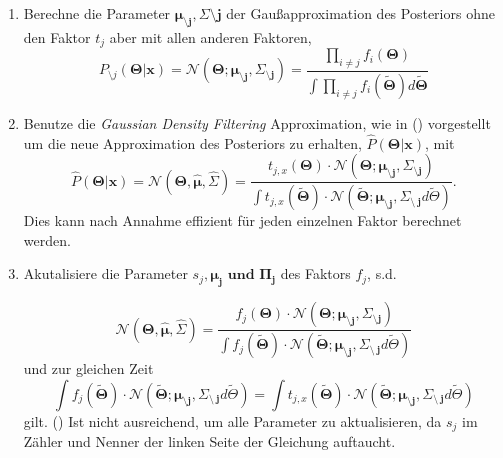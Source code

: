 \documentclass[12pt,a4paper]{scrartcl}
\numberwithin{equation}{section}
\begin{document}
\begin{enumerate}
 \item Berechne die Parameter $ \mathbf{\mu_{\setminus j}}, \mathbf{\varSigma{\setminus j}} $ der Gaußapproximation des Posteriors ohne
  den Faktor $t_j$ aber mit allen anderen Faktoren, 
  \begin{equation}
   P_{\setminus j}(\mathbf{\Theta|x}) = \mathcal{N}(\mathbf{\Theta; \mu_{ \setminus j} , \varSigma_{\setminus j}}) = \frac{\prod_{i \neq j}{f_i(\mathbf{\Theta})}}{ \int \prod_{i \neq j}{f_i(\mathbf{\tilde \Theta})} d \mathbf{\tilde \Theta} }
  \end{equation}

  \item Benutze die \textit{Gaussian Density Filtering} Approximation, wie in () vorgestellt um die neue 
  Approximation des Posteriors zu erhalten, $\hat P(\mathbf{\Theta|x})$, mit
  \begin{equation}
   \hat P(\mathbf{\Theta|x}) = \mathcal{N}(\mathbf{\Theta, \hat \mu, \hat \varSigma}) = \frac{ t_{j,x}(\mathbf{\Theta}) \cdot \mathcal{N}(\mathbf{\Theta; \mu_{\setminus j}, \varSigma_{\setminus j}})}{\int t_{j,x}(\mathbf{ \tilde \Theta}) \cdot \mathcal{N}(\mathbf{\tilde \Theta; \mu_{ \setminus j}, \varSigma_{\setminus\ j}} d \tilde \Theta ) }.
  \end{equation}
  Dies kann nach Annahme effizient für jeden einzelnen Faktor berechnet werden. 
  \item Akutalisiere die Parameter $s_j, \mathbf{\mu_j \text{ und } \Pi_j}$ des Faktors $f_j$, s.d.
  
  \begin{equation}
   \mathcal{N}(\mathbf{\Theta, \hat \mu, \hat \varSigma}) = \frac{ f_j(\mathbf{\Theta}) \cdot \mathcal{N}(\mathbf{\Theta; \mu_{\setminus j}, \varSigma_{\setminus j}})}{\int f_j(\mathbf{ \tilde \Theta}) \cdot \mathcal{N}(\mathbf{\tilde \Theta; \mu_{ \setminus j}, \varSigma_{\setminus\ j}} d \tilde \Theta ) }
  \end{equation}
   und zur gleichen Zeit
   \begin{equation}
    \int f_j(\mathbf{ \tilde \Theta}) \cdot \mathcal{N}(\mathbf{\tilde \Theta; \mu_{ \setminus j}, \varSigma_{\setminus\ j}} d \tilde \Theta ) = \int t_{j,x}(\mathbf{ \tilde \Theta}) \cdot \mathcal{N}(\mathbf{\tilde \Theta; \mu_{ \setminus j}, \varSigma_{\setminus\ j}} d \tilde \Theta ) 
   \end{equation}
   gilt. () Ist nicht ausreichend, um alle Parameter zu aktualisieren, da $s_j$ im Zähler und Nenner der linken Seite
   der Gleichung auftaucht. 
\end{enumerate}
\end{document}
